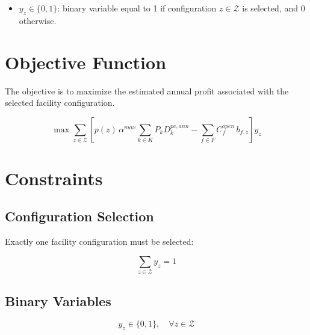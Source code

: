 \documentclass[12pt]{article}
\begin{document}
\begin{itemize}
    \item $y_z \in \{0,1\}$: binary variable equal to 1 if configuration $z \in \mathcal{Z}$ is selected, and 0 otherwise.
\end{itemize}

\newpage

\section{Objective Function}

The objective is to maximize the estimated annual profit associated with the selected facility configuration.

\[
\max \sum_{z \in \mathcal{Z}} 
\left[
p(z)\,\alpha^{max} \sum_{k \in K} P_k D^{pc,ann}_k
-
\sum_{f \in F} C^{open}_f \, b_{f,z}
\right] y_z
\]

\newpage

\section{Constraints}

\subsection{Configuration Selection}

Exactly one facility configuration must be selected:

\[
\sum_{z \in \mathcal{Z}} y_z = 1
\]

\subsection{Binary Variables}

\[
y_z \in \{0,1\}, \quad \forall z \in \mathcal{Z}
\]
\end{document}
